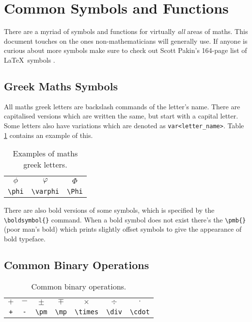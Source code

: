 \section{Common Symbols and Functions}
%
There are a myriad of symbols and functions for virtually \emph{all}
areas of maths.  This document touches on the ones non-mathematicians
will generally use.  If anyone is curious about more symbols make sure
to check out Scott Pakin's 164-page list of \LaTeX~symbols
\cite{symbols}.
%
\subsection{Greek Maths Symbols}
%
All maths greek letters are backslash commands of the letter's name.
There are capitalised versions which are written the same, but start
with a capital letter.  Some letters also have variations which are
denoted as \verb|var<letter_name>|.  Table \ref{t:mg} contains an
example of this.
\begin{table}[!htbp]
    \centering
    \caption{Examples of maths greek letters.}
    \label{t:mg}
    \begin{tabular}{ccc}
        $\phi$ & $\varphi$ & $\Phi$\\
        \verb|\phi| & \verb|\varphi| & \verb|\Phi|
    \end{tabular}
\end{table}
There are also bold versions of some symbols, which is specified by
the \verb|\boldsymbol{}| command.  When a bold symbol does not exist
there's the \verb|\pmb{}| (poor man's bold) which prints slightly
offset symbols to give the appearance of bold typeface.
%
\subsection{Common Binary Operations}
%
\begin{table}[!htbp]
    \centering
    \caption{Common binary operations.}
    \label{t:bo}
    \begin{tabular}{ccccccc}
        $+$ &   $-$   & $\pm$   &   $\mp$   &   $\times$    &   $\div$  &   $\cdot$ \\
        \verb|+|    &   \verb|-|    &   \verb|\pm|  &   \verb|\mp|  &   \verb|\times|   &   \verb|\div| &   \verb|\cdot|    \\
    \end{tabular}
\end{table}
%
